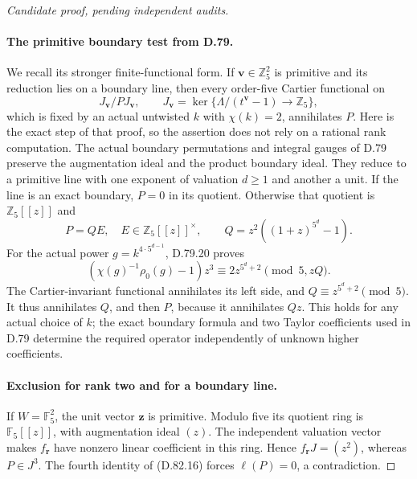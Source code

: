 \begin{proof}[Candidate proof, pending independent audits]
\paragraph{The primitive boundary test from D.79.}
We recall its stronger finite-functional form. If
\(\mathbf v\in\mathbb Z_5^2\) is primitive and its reduction
lies on a boundary line, then every order-five
Cartier functional on
\[
 J_{\mathbf v}/P J_{\mathbf v},\qquad
 J_{\mathbf v}=\ker\{\Lambda/(t^{\mathbf v}-1)\to\mathbb Z_5\},
 \]
which is fixed by an actual untwisted \(k\) with \(\chi(k)=2\),
annihilates \(P\).
Here is the exact step of that proof, so the assertion does
not rely on a rational rank computation. The actual boundary
permutations and integral gauges of D.79 preserve the
augmentation ideal and the product boundary ideal.
They reduce to a primitive line with one exponent of
valuation \(d\ge1\) and another a unit. If the line is an
exact boundary, \(P=0\) in its quotient. Otherwise that
quotient is \(\mathbb Z_5[[z]]\) and
\[
 P=Q E,\quad E\in\mathbb Z_5[[z]]^\times,\qquad
 Q=z^2((1+z)^{5^d}-1).
 \]
For the actual power \(g=k^{4\cdot5^{d-1}}\), D.79.20 proves
\[
 (\chi(g)^{-1}\rho_0(g)-1)z^3
          \equiv2z^{5^d+2}\pmod{5,zQ}.
                                                               \tag{D.82.17}
\]
The Cartier-invariant functional annihilates its left side,
and \(Q\equiv z^{5^d+2}\pmod5\). It thus annihilates \(Q\),
and then \(P\), because it annihilates \(Qz\).
This holds for any actual choice of \(k\); the exact boundary
formula and two Taylor coefficients used in D.79 determine
the required operator independently of unknown higher coefficients.

\paragraph{Exclusion for rank two and for a boundary line.}
If \(W=\mathbb F_5^2\), the unit vector \(\mathbf z\)
is primitive. Modulo five its quotient ring is
\(\mathbb F_5[[z]]\), with augmentation ideal \((z)\).
The independent valuation vector makes \(f_{\mathbf r}\)
have nonzero linear coefficient in this ring. Hence
\(f_{\mathbf r}J=(z^2)\), whereas \(P\in J^3\).
The fourth identity of (D.82.16) forces \(\ell(P)=0\),
a contradiction.


\end{proof}

